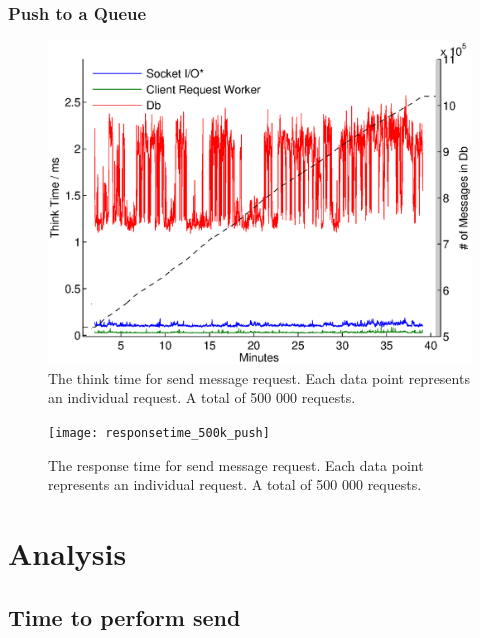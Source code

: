 \documentclass{article}
\begin{document}
        \subsubsection{Push to a Queue}
        
			\begin{figure}[H]
                \hspace{-1.5cm}
                \includegraphics[scale=0.50]{thinktime_500k_push}
                \caption{The think time for send message request. Each data point represents an individual request. A total of 500 000 requests.}
                \label{fig:thinktime_500k_push}
            \end{figure}
            
			\begin{figure}[H]
                \hspace{-1.5cm}
                \texttt{[image: responsetime\_500k\_push]}
                \caption{The response time for send message request. Each data point represents an individual request. A total of 500 000 requests.}
                \label{fig:responsetime_500k_push}
            \end{figure}
            
            
    \section{Analysis}
        \subsection{Time to perform send}
\end{document}
